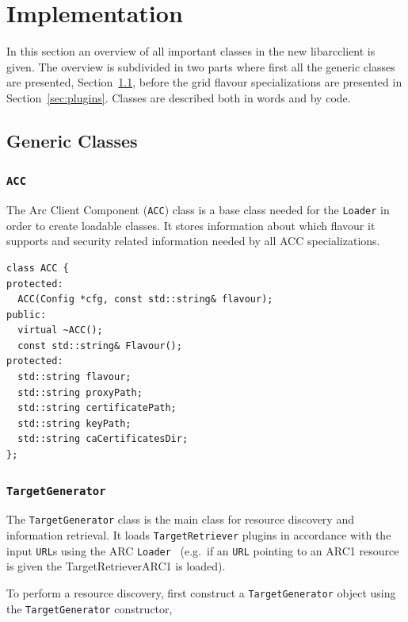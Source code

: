 \documentclass{book}
\newcommand{\arclib}{libarcclient}
\newcommand{\ACC}{\texttt{ACC}}
\newcommand{\Loader}{\texttt{Loader}}
\newcommand{\TargetGenerator}{\texttt{TargetGenerator}}
\newcommand{\TargetRetriever}{\texttt{TargetRetriever}}
\newcommand{\URL}{\texttt{URL}}
\begin{document}
\chapter{Implementation}
\label{sec:Implementation}

In this section an overview of all important classes in the new
{\arclib} is given. The overview is subdivided in two parts where
first all the generic classes are presented,
Section~\ref{sec:genclass}, before the grid flavour specializations
are presented in Section~\ref{sec:plugins}. Classes are described both
in words and by code.

\section{Generic Classes}
\label{sec:genclass}

\subsection{{\ACC}}

The Arc Client Component ({\ACC}) class is a base class needed for the
{\Loader} in order to create loadable classes. It stores information
about which flavour it supports and security related information
needed by all ACC specializations.

\begin{shaded}
\begin{verbatim}
class ACC {
protected:
  ACC(Config *cfg, const std::string& flavour);
public:
  virtual ~ACC();
  const std::string& Flavour();
protected:
  std::string flavour;
  std::string proxyPath;
  std::string certificatePath;
  std::string keyPath;
  std::string caCertificatesDir;
};
\end{verbatim}
\end{shaded}

\subsection{{\TargetGenerator}}

The {\TargetGenerator} class is the main class for resource discovery
and information retrieval. It loads {\TargetRetriever} plugins in
accordance with the input {\URL}s using the ARC {\Loader}~\cite{hed}
(e.g.\ if an {\URL} pointing to an ARC1 resource is given the
TargetRetrieverARC1 is loaded).

To perform a resource discovery, first construct a {\TargetGenerator}
object using the {\TargetGenerator} constructor,
\end{document}
